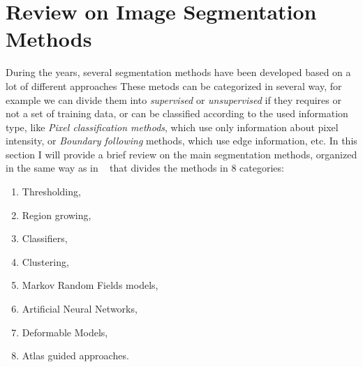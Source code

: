 \documentclass{standalone}
\begin{document}
	
	\section{Review on Image Segmentation Methods}

		During the years, several segmentation methods have been developed based on a lot of different approaches These metods can be categorized in several way, for example we can divide them into \emph{supervised} or \emph{unsupervised} if they requires or not a set of training data, or can be classified according to the used information type, like \emph{Pixel classification methods}, which use only information about pixel intensity, or \emph{Boundary following} methods, which use edge information, etc. In this section I will provide a brief review on the main segmentation methods, organized in the same way as in ~\cite{ART:Pham} that divides the methods in 8 categories: 
		\begin{enumerate}

			\item Thresholding, 

			\item Region growing,

			\item Classifiers,

			\item Clustering,

			\item Markov Random Fields models, 
	
			\item Artificial Neural Networks,

			\item Deformable Models,

			\item Atlas guided approaches.


		\end{enumerate}
\end{document}
